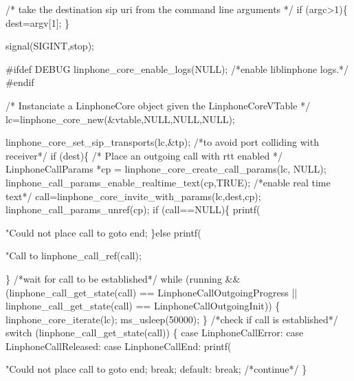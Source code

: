\begin{DoxyCodeInclude}
        \textcolor{comment}{/* take the destination sip uri from the command line arguments */}
        \textcolor{keywordflow}{if} (argc>1)\{
                dest=argv[1];
        \}

        signal(SIGINT,stop);

\textcolor{preprocessor}{#ifdef DEBUG}
        linphone_core_enable_logs(NULL); \textcolor{comment}{/*enable liblinphone logs.*/}
\textcolor{preprocessor}{#endif}

        \textcolor{comment}{/*}
\textcolor{comment}{         Instanciate a LinphoneCore object given the LinphoneCoreVTable}
\textcolor{comment}{        */}
        lc=linphone_core_new(&vtable,NULL,NULL,NULL);


        linphone_core_set_sip_transports(lc,&tp); \textcolor{comment}{/*to avoid port colliding with receiver*/}
        \textcolor{keywordflow}{if} (dest)\{
                \textcolor{comment}{/*}
\textcolor{comment}{                 Place an outgoing call with rtt enabled}
\textcolor{comment}{                */}
                LinphoneCallParams *cp = linphone_core_create_call_params(lc, NULL);
                linphone_call_params_enable_realtime_text(cp,TRUE); \textcolor{comment}{/*enable real time text*/}
                call=linphone_core_invite_with_params(lc,dest,cp);
                linphone_call_params_unref(cp);
                \textcolor{keywordflow}{if} (call==NULL)\{
                        printf(\textcolor{stringliteral}{"Could not place call to %
                        \textcolor{keywordflow}{goto} end;
                \}\textcolor{keywordflow}{else} printf(\textcolor{stringliteral}{"Call to %
                linphone_call_ref(call);

        \}
        \textcolor{comment}{/*wait for call to be established*/}
        \textcolor{keywordflow}{while}   (running && (linphone_call_get_state(call) == 
      LinphoneCallOutgoingProgress
                                                || linphone_call_get_state(call) == 
      LinphoneCallOutgoingInit)) \{
                linphone_core_iterate(lc);
                ms\_usleep(50000);
        \}
        \textcolor{comment}{/*check if call is established*/}
        \textcolor{keywordflow}{switch} (linphone_call_get_state(call)) \{
        \textcolor{keywordflow}{case} LinphoneCallError:
        \textcolor{keywordflow}{case} LinphoneCallReleased:
        \textcolor{keywordflow}{case} LinphoneCallEnd:
                printf(\textcolor{stringliteral}{"Could not place call to %
                \textcolor{keywordflow}{goto} end;
                \textcolor{keywordflow}{break};
        \textcolor{keywordflow}{default}:
                \textcolor{keywordflow}{break};
                \textcolor{comment}{/*continue*/}
        \}

}}}
\end{DoxyCodeInclude}

